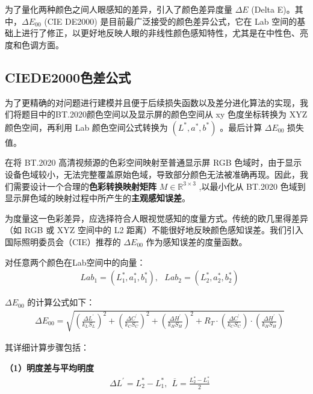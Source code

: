 为了量化两种颜色之间人眼感知的差异，引入了颜色差异度量 $\Delta E$ (Delta E)。其中，$\Delta E_{00}$ (CIE DE2000) 是目前最广泛接受的颜色差异公式，它在 Lab 空间的基础上进行了修正，以更好地反映人眼的非线性颜色感知特性，尤其是在中性色、亮度和色调方面。

\subsection[\hspace{-2pt}CIEDE2000色差公式]{{\heiti{} \hspace{-8pt}CIEDE2000色差公式}}\label{subsection2: CIEDE2000色差公式}

为了更精确的对问题进行建模并且便于后续损失函数以及差分进化算法的实现，我们将题目中的BT.2020颜色空间以及显示屏的颜色空间从 xy 色度坐标转换为 XYZ 颜色空间，再利用 Lab 颜色空间公式转换为 $(L^{*},a^{*},b^{*})$ 。最后计算 $\Delta E_{00}$ 损失值。

在将 BT.2020 高清视频源的色彩空间映射至普通显示屏 RGB 色域时，由于显示设备色域较小，无法完整覆盖原始色域，导致部分颜色无法被准确再现。因此，我们需要设计一个合理的\textbf{色彩转换映射矩阵} $M\in \mathbb{R}^{3\times 3}$ ,以最小化从 BT.2020 色域到显示屏色域的映射过程中所产生的\textbf{主观感知误差}。

为度量这一色彩差异，应选择符合人眼视觉感知的度量方式。传统的欧几里得差异（如 RGB 或 XYZ 空间中的 L2 距离）不能很好地反映颜色感知误差。我们引入国际照明委员会（CIE）推荐的 $\Delta E_{00}$ 作为感知误差的度量函数。

对任意两个颜色在Lab空间中的向量：
\begin{equation}
\begin{aligned}
  &Lab_{1} = (L^{*}_{1},a^{*}_{1},b^{*}_{1}),\ \ \ Lab_{2}=(L^{*}_{2},a^{*}_{2},b^{*}_{2})
\end{aligned}
\end{equation}

$\Delta E_{00}$ 的计算公式如下\cite{YSZL200407020}：
\begin{equation}
\begin{aligned}
  &\Delta E_{00}=\sqrt{(\frac{\Delta L^{'}}{k_{L}S_{L}})^{2}+(\frac{\Delta C^{'}}{k_{C}S_{C}})^{2}+(\frac{\Delta H^{'}}{k_{H}S_{H}})^{2}+R_{T}\cdot{(\frac{\Delta C^{'}}{k_{C}S_{C}})}\cdot (\frac{\Delta H^{'}}{k_{H}S_{H}})}
\end{aligned}
\end{equation}

其详细计算步骤包括：

\textbf{（1）明度差与平均明度}
\begin{equation}
\begin{aligned}
   &\Delta L^{'} = L^{*}_{2}-L^{*}_{1},\ \ \overline{L}=\frac{L^{*}_{2}-L^{*}_{1}}{2}
\end{aligned}
\end{equation}

